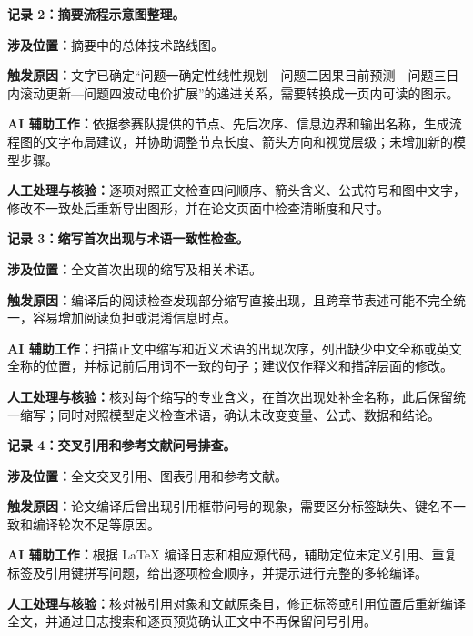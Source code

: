 \documentclass[withoutpreface,bwprint]{cumcmthesis}
\begin{document}
\par\medskip\noindent\textbf{记录 2：摘要流程示意图整理。}\par
\par\noindent\textbf{涉及位置：}摘要中的总体技术路线图。
\par\noindent\textbf{触发原因：}文字已确定“问题一确定性线性规划---问题二因果日前预测---问题三日内滚动更新---问题四波动电价扩展”的递进关系，需要转换成一页内可读的图示。
\par\noindent\textbf{AI 辅助工作：}依据参赛队提供的节点、先后次序、信息边界和输出名称，生成流程图的文字布局建议，并协助调整节点长度、箭头方向和视觉层级；未增加新的模型步骤。
\par\noindent\textbf{人工处理与核验：}逐项对照正文检查四问顺序、箭头含义、公式符号和图中文字，修改不一致处后重新导出图形，并在论文页面中检查清晰度和尺寸。

\par\medskip\noindent\textbf{记录 3：缩写首次出现与术语一致性检查。}\par
\par\noindent\textbf{涉及位置：}全文首次出现的缩写及相关术语。
\par\noindent\textbf{触发原因：}编译后的阅读检查发现部分缩写直接出现，且跨章节表述可能不完全统一，容易增加阅读负担或混淆信息时点。
\par\noindent\textbf{AI 辅助工作：}扫描正文中缩写和近义术语的出现次序，列出缺少中文全称或英文全称的位置，并标记前后用词不一致的句子；建议仅作释义和措辞层面的修改。
\par\noindent\textbf{人工处理与核验：}核对每个缩写的专业含义，在首次出现处补全名称，此后保留统一缩写；同时对照模型定义检查术语，确认未改变变量、公式、数据和结论。

\par\medskip\noindent\textbf{记录 4：交叉引用和参考文献问号排查。}\par
\par\noindent\textbf{涉及位置：}全文交叉引用、图表引用和参考文献。
\par\noindent\textbf{触发原因：}论文编译后曾出现引用框带问号的现象，需要区分标签缺失、键名不一致和编译轮次不足等原因。
\par\noindent\textbf{AI 辅助工作：}根据 LaTeX 编译日志和相应源代码，辅助定位未定义引用、重复标签及引用键拼写问题，给出逐项检查顺序，并提示进行完整的多轮编译。
\par\noindent\textbf{人工处理与核验：}核对被引用对象和文献原条目，修正标签或引用位置后重新编译全文，并通过日志搜索和逐页预览确认正文中不再保留问号引用。
\end{document}

